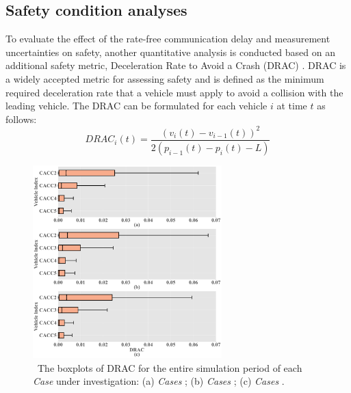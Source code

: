 \documentclass[a4paper]{cas-sc}
\begin{document}
\subsection{Safety condition analyses}
\label{Section 5.4}


To evaluate the effect of the rate-free communication delay and measurement uncertainties on safety, another quantitative analysis is conducted based on an additional safety metric, Deceleration Rate to Avoid a Crash (DRAC) \citep{meng2011evaluation}. DRAC is a widely accepted metric for assessing safety and is defined as the minimum required deceleration rate that a vehicle must apply to avoid a collision with the leading vehicle. The DRAC can be formulated for each vehicle $i$ at time $t$ as follows:
\begin{equation*}
  DRAC{_i}(t) = \frac{{{{\left( {{v_i}(t) - {v_{i - 1}}(t)} \right)}^2}}}{{2\left( {{p_{i - 1}}(t) - {p_i}(t) - L} \right)}}
\end{equation*}

\begin{figure}
  \centering
  \includegraphics[width=0.65\textwidth]{figs/fig5.png}
  \caption
  {~The boxplots of DRAC for the entire simulation period of each \textit{Case} under investigation: (a) \textit{Cases \uppercase\expandafter{}}; (b) \textit{Cases \uppercase\expandafter{}}; (c) \textit{Cases \uppercase\expandafter{}}.} 
  \label{fig5}
\end{figure}
\end{document}
